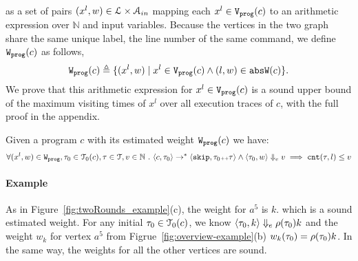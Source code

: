 as a set of pairs $(x^l, w) \in \mathcal{L} \times \mathcal{A}_{in}$
mapping each $x^l \in \mathtt{{V_{prog}}}(c)$ to an arithmetic  expression over $\mathbb{N}$ and
input variables. 
Because
the vertices in the two graph share the same unique label, the line number of the same command,
we define $\mathtt{{W_{prog}}}(c)$
as follows,
{
 \[\mathtt{{W_{prog}}}(c) \triangleq
  \{ (x^l, w)
\mid
x^l \in \mathtt{{V_{prog}}}(c) \land (l, w) \in \mathtt{abs}{\mathtt{W}}(c)
\}.
\]
}
%
We prove that this 
arithmetic expression for $x^l \in \mathtt{{V_{prog}}}(c)$ is a sound upper bound of 
the maximum visiting times of $x^l$ over all execution traces of $c$, with the full proof in the appendix.
  \begin{thm}
    \label{thm:addweight_soundness}
  Given a program ${c}$ with its estimated weight $\mathtt{{W_{prog}}}(c)$
  we have:
  \[
  \forall (x^l, w) \in \mathtt{{W_{prog}}}, \mathtt{\tau}_0 \in \mathcal{T}_0(c), \mathtt{\tau} \in \mathcal{T},
  v \in \mathbb{N}
   ~.~ 
  \langle {c}, \mathtt{\tau}_0 \rangle \to^{*} \langle \mathtt{skip}, \mathtt{\tau}_0 {\scriptscriptstyle ++}\mathtt{\tau} \rangle 
  \land 
  \langle \mathtt{\tau}_0, w \rangle \Downarrow_e v
  \implies
  \mathtt{cnt}(\mathtt{\tau}, l) \leq v
  \]
  \end{thm}
%
\paragraph*{Example} 
As in
Figure~\ref{fig:twoRounds_example}(c),
the weight for $a^5$ is $k$. which is a sound estimated weight.
For any initial $\mathtt{\tau}_0 \in \mathcal{T}_0(c)$, we know $\langle \mathtt{\tau}_0, k \rangle \Downarrow_e \rho(\mathtt{\tau}_0) k$ and
the weight $w_k$ for vertex $a^5$ from Figrue~\ref{fig:overview-example}(b)
$w_k(\mathtt{\tau}_0) = \rho(\mathtt{\tau}_0) k$. 
%
In the same way, the weights for all the other vertices are sound.
